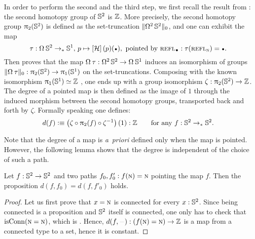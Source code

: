 \documentclass[english,a4paper]{lmcs}
\begin{document}
In order to perform the second and the third step, we first recall the result
from \cite[Cor. 8.5.2]{HoTT}: the second homotopy group of ${{\mathbb S^{2}}}$ is $\mathbb{Z}$. More
precisely, the second homotopy group $\uppi_{2}({{\mathbb S^{2}}})$ is defined as the
set-truncation $\lVert\mathop{\Omega^{2}} {{\mathbb S^{2}}}\rVert_0$, and one can exhibit the map
\begin{displaymath}
  \tau: \loopspace\null\Sp \ptdto \Sc, \, p \mapsto \ap\hopf(p)(\base),
\text{ pointed by $\refl{\base}:\tau(\refl\north)=\base$}.
\end{displaymath}
Then \cite[Section 8.4 and 8.5]{HoTT} proves that the map $\loopspace\null\tau :
\loopspace 2 \Sp \to \loopspace \null \Sc$ induces an isomorphism of groups
$\setTrunc{\loopspace\null\tau}: \hgr 2(\Sp) \to \hgr 1(\Sc)$ on the set-truncations.
Composing with the known isomorphism $\uppi_{1}({{\mathbb S^{1}}}) \simeq \mathbb{Z}$ \cite[Cor. 8.1.11]{HoTT}, one
ends up with a group isomorphism $\zeta: \uppi_{2}({{\mathbb S^{2}}}) \to \mathbb{Z}$. The degree of a
pointed map is then defined as the image of $1$ through the induced morphism
between the second homotopy groups, transported back and forth by $\zeta$.
Formally speaking one defines:
\begin{displaymath}
  d(f) \vcentcolon\equiv \left(\zeta\circ\uppi_{2}(f)\circ \zeta^{-1}\right)(1):\mathbb{Z} \qquad
  \text{for any}\ f:{{\mathbb S^{2}}}\to_\ast{{\mathbb S^{2}}}.
\end{displaymath}

Note that the degree of a map is \emph{a~priori} defined only when the map is pointed. However,
the following lemma shows that the degree is independent of the choice of such
a path.
\begin{lem}
  Let $f: {{\mathbb S^{2}}} \to {{\mathbb S^{2}}}$ and two paths $f_0,f_0': f(\textsc{n}) = \textsc{n}$
  pointing the map $f$.
  Then the proposition $d(f,f_0) = d(f,f'_0)$ holds.
  \label{lem:deg-independent-path}
\end{lem}
\begin{proof}
  Let us first prove that $x=\textsc{n}$ is connected for every $x:{{\mathbb S^{2}}}$.
  Since being connected is a proposition and ${{\mathbb S^{2}}}$ itself is connected,
  one only has to check that $\mathrm{isConn}(\textsc{n}=\textsc{n})$,
  which is \cite[Cor.~8.3.3]{HoTT}.
  Hence, $d(f,\blank) : (f(\north) = \north) \to \ZZ$ is a map
  from a connected type to a set,
  hence it is constant.
\end{proof}
\end{document}
